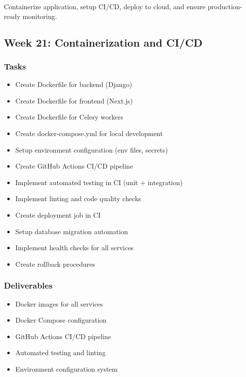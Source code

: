 \documentclass[12pt,oneside]{report}
\begin{document}
Containerize application, setup CI/CD, deploy to cloud, and ensure production-ready monitoring.

\subsection{Week 21: Containerization and CI/CD}

\subsubsection{Tasks}

\begin{itemize}
    \item Create Dockerfile for backend (Django)
    \item Create Dockerfile for frontend (Next.js)
    \item Create Dockerfile for Celery workers
    \item Create docker-compose.yml for local development
    \item Setup environment configuration (env files, secrets)
    \item Create GitHub Actions CI/CD pipeline
    \item Implement automated testing in CI (unit + integration)
    \item Implement linting and code quality checks
    \item Create deployment job in CI
    \item Setup database migration automation
    \item Implement health checks for all services
    \item Create rollback procedures
\end{itemize}

\subsubsection{Deliverables}

\begin{itemize}
    \item Docker images for all services
    \item Docker Compose configuration
    \item GitHub Actions CI/CD pipeline
    \item Automated testing and linting
    \item Environment configuration system
\end{itemize}
\end{document}

